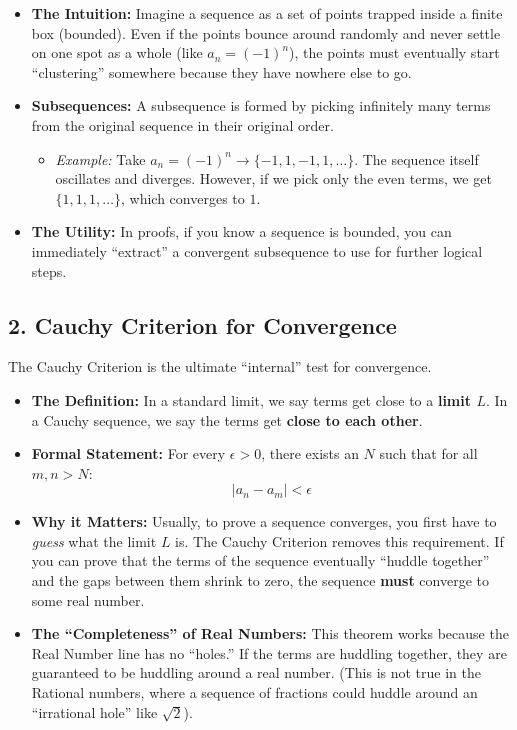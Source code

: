 \begin{itemize}[leftmargin=*]
\item \textbf{The Intuition:} Imagine a sequence as a set of points trapped inside a finite box (bounded). Even if the points bounce around randomly and never settle on one spot as a whole (like $a_n = (-1)^n$), the points must eventually start ``clustering'' somewhere because they have nowhere else to go.
\item \textbf{Subsequences:} A subsequence is formed by picking infinitely many terms from the original sequence in their original order.
    \begin{itemize}
    \item \textit{Example:} Take $a_n = (-1)^n \rightarrow \{-1, 1, -1, 1, \dots\}$. The sequence itself oscillates and diverges. However, if we pick only the even terms, we get $\{1, 1, 1, \dots\}$, which converges to $1$.
    \end{itemize}
\item \textbf{The Utility:} In proofs, if you know a sequence is bounded, you can immediately ``extract'' a convergent subsequence to use for further logical steps.
\end{itemize}

\subsection*{2. Cauchy Criterion for Convergence}

The Cauchy Criterion is the ultimate ``internal'' test for convergence. 

\begin{itemize}[leftmargin=*]
\item \textbf{The Definition:} In a standard limit, we say terms get close to a \textbf{limit $L$}. In a Cauchy sequence, we say the terms get \textbf{close to each other}. 
\item \textbf{Formal Statement:} For every $\epsilon > 0$, there exists an $N$ such that for all $m, n > N$:
    \[
    |a_n - a_m| < \epsilon
    \]
\item \textbf{Why it Matters:} Usually, to prove a sequence converges, you first have to \emph{guess} what the limit $L$ is. The Cauchy Criterion removes this requirement. If you can prove that the terms of the sequence eventually ``huddle together'' and the gaps between them shrink to zero, the sequence \textbf{must} converge to some real number.
\item \textbf{The ``Completeness'' of Real Numbers:} This theorem works because the Real Number line has no ``holes.'' If the terms are huddling together, they are guaranteed to be huddling around a real number. (This is not true in the Rational numbers, where a sequence of fractions could huddle around an ``irrational hole'' like $\sqrt{2}$).
\end{itemize}
